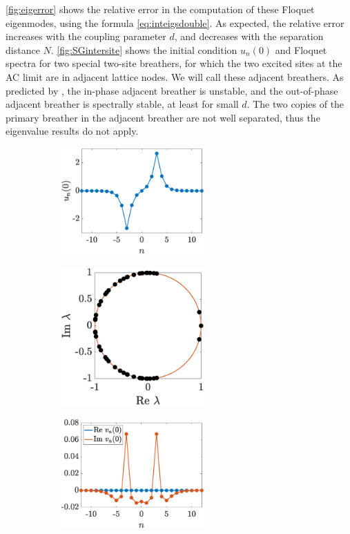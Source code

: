 \documentclass[12pt,reqno]{amsart}
\theoremstyle{definition}
\begin{document}
\cref{fig:eigerror} shows the relative error in the computation of these Floquet eigenmodes, using the formula \cref{eq:inteigsdouble}. As expected, the relative error increases with the coupling parameter $d$, and decreases with the separation distance $N$. \cref{fig:SGintersite} shows the initial condition $u_n(0)$ and Floquet spectra for two special two-site breathers, for which the two excited sites at the AC limit are in adjacent lattice nodes. We will call these adjacent breathers.
As predicted by \cite{cuevas-maraver2016}, the in-phase adjacent breather is unstable, and the out-of-phase adjacent breather is spectrally stable, at least for small $d$. The two copies of the primary breather in the adjacent breather are not well separated, thus the eigenvalue results do not apply.

\begin{figure}
	\begin{center}
	\begin{subfigure}{0.3\linewidth}
		\caption{}
		\includegraphics[width=5.5cm]{doubleun0.eps} \hspace{-0.5cm}
		\label{fig:doublea}
	\end{subfigure}
	\begin{subfigure}{0.3\linewidth}
		\caption{}
		\includegraphics[width=5.5cm]{doublespec.eps} \hspace{-0.5cm}
		\label{fig:doubleb}
	\end{subfigure}
	\begin{subfigure}{0.3\linewidth}
		\caption{}
		\includegraphics[width=5.5cm]{doubleinteig.eps} 

\end{subfigure}
\end{center}
\end{figure}
\end{document}
